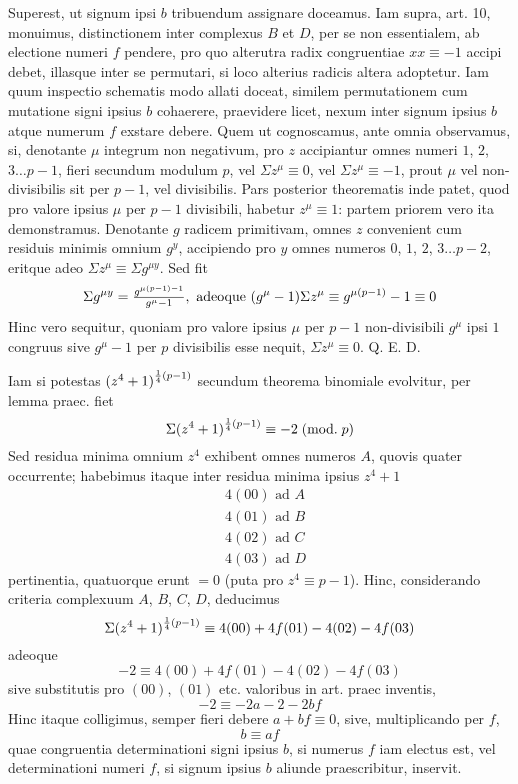 \documentclass[twoside,12pt]{memoir}
\renewcommand{\pmod}[1]{\;(\textrm{mod.}\;#1)}
\let\oldfrac\frac
\def\frac#1#2{\mathchoice{\tfrac{#1}{#2}}{\oldfrac{#1}{#2}}{\genfrac{}{}{}{2}{#1}{#2\mathstrut}}{\genfrac{}{}{}{3}{#1}{#2\mathstrut}}}
\begin{document}
Superest, ut signum ipsi \(b\) tribuendum assignare doceamus. Iam supra, art. 10, monuimus, distinctionem inter complexus \(B\) et \(D\), per se non essentialem, ab electione numeri \(f\) pendere, pro quo alterutra radix congruentiae \(x x \equiv-1\) accipi debet, illasque inter se permutari, si loco alterius radicis altera adoptetur. Iam quum inspectio schematis modo allati doceat, similem permutationem cum mutatione signi ipsius \(b\) cohaerere, praevidere licet, nexum inter signum ipsius \(b\) atque numerum \(f\) exstare debere. Quem ut cognoscamus, ante omnia observamus, si, denotante \(\mu\) integrum non negativum, pro \(z\) accipiantur omnes numeri \(1\), \(2\), \(3 \ldots p-1\), fieri secundum modulum \(p\), vel \(\Sigma z^{\mu} \equiv 0\), vel \(\Sigma z^{\mu} \equiv-1\), prout \(\mu\) vel non-divisibilis sit per \(p-1\), vel divisibilis. Pars posterior theorematis inde patet, quod pro valore ipsius \(\mu\) per \(p-1\) divisibili, habetur \(z^{\mu} \equiv 1\): partem priorem vero ita demonstramus. Denotante \(g\) radicem primitivam, omnes \(z\) convenient cum residuis minimis omnium \(g^{y}\), accipiendo pro \(y\) omnes numeros \(0\), \(1\), \(2\), \(3 \ldots p-2\), eritque adeo \(\Sigma z^{\mu} \equiv \Sigma g^{\mu y}\). Sed fit
\[\Sigma g^{\mu y}=\frac{g^{\mu(p-1)-1}}{g^{\mu}-1}, \text{ adeoque }(g^{\mu}-1) \Sigma z^{\mu} \equiv g^{\mu(p-1)}-1 \equiv 0\]
Hinc vero sequitur, quoniam pro valore ipsius \(\mu\) per \(p-1\) non-divisibili \(g^{\mu}\) ipsi \(1\) congruus sive \(g^{\mu}-1\) per \(p\) divisibilis esse nequit, \(\Sigma z^{\mu} \equiv 0\). Q. E. D.\pagebreak%

Iam si potestas \((z^{4}+1)^{\frac{1}{4}(p-1)}\) secundum theorema binomiale evolvitur, per lemma praec. fiet
\[\Sigma(z^{4}+1)^{\frac{1}{4}(p-1)} \equiv-2\pmod{p}\]
Sed residua minima omnium \(z^{4}\) exhibent omnes numeros \(A\), quovis quater occurrente; habebimus itaque inter residua minima ipsius \(z^{4}+1\)
\[\begin{aligned}
& 4(00) \text{ ad } A \\
& 4(01) \text{ ad } B \\
& 4(02) \text{ ad } C \\
& 4(03) \text{ ad } D
\end{aligned}\]
pertinentia, quatuorque erunt \(=0\) (puta pro \(z^{4} \equiv p-1\)). Hinc, considerando criteria complexuum \(A\), \(B\), \(C\), \(D\), deducimus
\[\Sigma(z^{4}+1)^{\frac{1}{4}(p-1)} \equiv 4(00)+4 f (01)-4 (02)-4 f (03)\]
adeoque
\[-2 \equiv 4(00)+4 f(01)-4(02)-4 f(03)\]
sive substitutis pro \((00)\), \((01)\) etc. valoribus in art. praec inventis,
\[-2 \equiv-2 a-2-2 b f\]
Hinc itaque colligimus, semper fieri debere \(a+b f \equiv 0\), sive, multiplicando per \(f\),
\[b \equiv a f\]
quae congruentia determinationi signi ipsius \(b\), si numerus \(f\) iam electus est, vel determinationi numeri \(f\), si signum ipsius \(b\) aliunde praescribitur, inservit.
\end{document}
